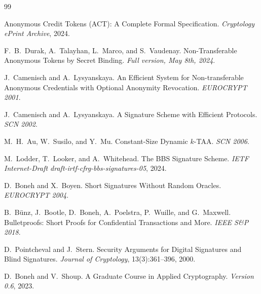 \documentclass[11pt]{article}
\theoremstyle{definitionstyle}
\theoremstyle{plain}
\begin{document}

\begin{thebibliography}{99}

Anonymous Credit Tokens (ACT): A Complete Formal Specification.
\emph{Cryptology ePrint Archive}, 2024.

F.~B.~Durak, A.~Talayhan, L.~Marco, and S.~Vaudenay.
Non-Transferable Anonymous Tokens by Secret Binding.
\emph{Full version, May 8th, 2024}.

J.~Camenisch and A.~Lysyanskaya.
An Efficient System for Non-transferable Anonymous Credentials with Optional Anonymity Revocation.
\emph{EUROCRYPT 2001}.

J.~Camenisch and A.~Lysyanskaya.
A Signature Scheme with Efficient Protocols.
\emph{SCN 2002}.

M.~H.~Au, W.~Susilo, and Y.~Mu.
Constant-Size Dynamic $k$-TAA.
\emph{SCN 2006}.

M.~Lodder, T.~Looker, and A.~Whitehead.
The BBS Signature Scheme.
\emph{IETF Internet-Draft draft-irtf-cfrg-bbs-signatures-05}, 2024.

D.~Boneh and X.~Boyen.
Short Signatures Without Random Oracles.
\emph{EUROCRYPT 2004}.

B.~B{\"u}nz, J.~Bootle, D.~Boneh, A.~Poelstra, P.~Wuille, and G.~Maxwell.
Bulletproofs: Short Proofs for Confidential Transactions and More.
\emph{IEEE S\&P 2018}.

D.~Pointcheval and J.~Stern.
Security Arguments for Digital Signatures and Blind Signatures.
\emph{Journal of Cryptology}, 13(3):361--396, 2000.

D.~Boneh and V.~Shoup.
A Graduate Course in Applied Cryptography.
\emph{Version 0.6}, 2023.

\end{thebibliography}
\end{document}
